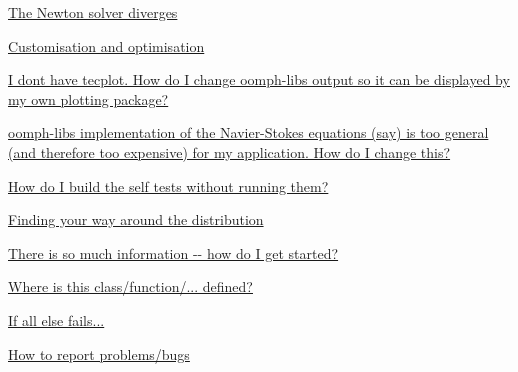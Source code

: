 \begin{DoxyItemize}
\begin{DoxyItemize}
\item \hyperlink{index_newton_divergence}{The Newton solver diverges} ~\newline
~\newline

\end{DoxyItemize}
\item \hyperlink{index_cust_opt}{Customisation and optimisation} ~\newline
~\newline

\begin{DoxyItemize}
\item \hyperlink{index_tecplot}{I don\textquotesingle{}t have tecplot. How do I change oomph-\/lib\textquotesingle{}s output so it can be displayed by my own plotting package?} ~\newline
~\newline

\item \hyperlink{index_element_too_general}{oomph-\/lib\textquotesingle{}s implementation of the Navier-\/\+Stokes equations (say) is too general (and therefore too expensive) for my application. How do I change this?} ~\newline
~\newline

\item \hyperlink{index_build_not_run_demos}{How do I build the self tests without running them?} ~\newline
~\newline

\end{DoxyItemize}
\item \hyperlink{index_nav}{Finding your way around the distribution} ~\newline
~\newline

\begin{DoxyItemize}
\item \hyperlink{index_too_much}{There is so much information -\/-\/ how do I get started?} ~\newline
~\newline

\item \hyperlink{index_includes}{Where is this class/function/... defined?} ~\newline
~\newline

\end{DoxyItemize}
\item \hyperlink{index_all_else_fails}{If all else fails...} ~\newline
~\newline

\begin{DoxyItemize}
\item \hyperlink{index_reporting}{How to report problems/bugs} ~\newline
~\newline

\end{DoxyItemize}
\end{DoxyItemize}

